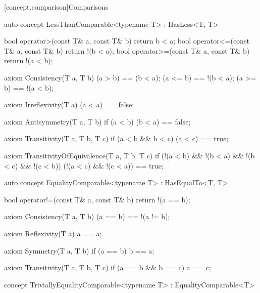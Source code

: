 \documentclass[american,twoside]{book}
\begin{document}
[concept.comparison]{Comparisons}
\begin{itemdecl}
auto concept LessThanComparable<typename T> : HasLess<T, T> {
  bool operator>(const T& a, const T& b) { return b < a; }
  bool operator<=(const T& a, const T& b) { return !(b < a); }
  bool operator>=(const T& a, const T& b) { return !(a < b); }

  axiom Consistency(T a, T b) {
    (a > b) == (b < a);
    (a <= b) == !(b < a);
    (a >= b) == !(a < b);
  }

  axiom Irreflexivity(T a) { (a < a) == false; }

  axiom Antisymmetry(T a, T b) { 
    if (a < b) 
      (b < a) == false;
  }

  axiom Transitivity(T a, T b, T c) {
    if (a < b && b < c) 
      (a < c) == true;
  }

  axiom TransitivityOfEquivalence(T a, T b, T c) {
    if (!(a < b) && !(b < a) && !(b < c) && !(c < b))
      (!(a < c) && !(c < a)) == true;
  } 
}
\end{itemdecl}

\begin{itemdescr}
\pnum 
{}
\end{itemdescr}

\begin{itemdecl}
auto concept EqualityComparable<typename T> : HasEqualTo<T, T> {
  bool operator!=(const T& a, const T& b) { return !(a == b); }

  axiom Consistency(T a, T b) {
    (a == b) == !(a != b);
  }

  axiom Reflexivity(T a) { a == a; }

  axiom Symmetry(T a, T b) { 
    if (a == b) 
      b == a; 
  }

  axiom Transitivity(T a, T b, T c) {
    if (a == b && b == c) 
      a == c;
  }
}
\end{itemdecl}

\begin{itemdescr}
\pnum
{}
\end{itemdescr}

\begin{itemdecl}
concept TriviallyEqualityComparable<typename T> : EqualityComparable<T> { }
\end{itemdecl}
\end{document}
